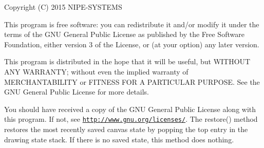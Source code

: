 Copyright (C) 2015 N\+I\+P\+E-\/\+S\+Y\+S\+T\+E\+M\+S

This program is free software\+: you can redistribute it and/or modify it under the terms of the G\+N\+U General Public License as published by the Free Software Foundation, either version 3 of the License, or (at your option) any later version.

This program is distributed in the hope that it will be useful, but W\+I\+T\+H\+O\+U\+T A\+N\+Y W\+A\+R\+R\+A\+N\+T\+Y; without even the implied warranty of M\+E\+R\+C\+H\+A\+N\+T\+A\+B\+I\+L\+I\+T\+Y or F\+I\+T\+N\+E\+S\+S F\+O\+R A P\+A\+R\+T\+I\+C\+U\+L\+A\+R P\+U\+R\+P\+O\+S\+E. See the G\+N\+U General Public License for more details.

You should have received a copy of the G\+N\+U General Public License along with this program. If not, see \href{http://www.gnu.org/licenses/}{\tt http\+://www.\+gnu.\+org/licenses/}. The restore() method restores the most recently saved canvas state by popping the top entry in the drawing state stack. If there is no saved state, this method does nothing. 